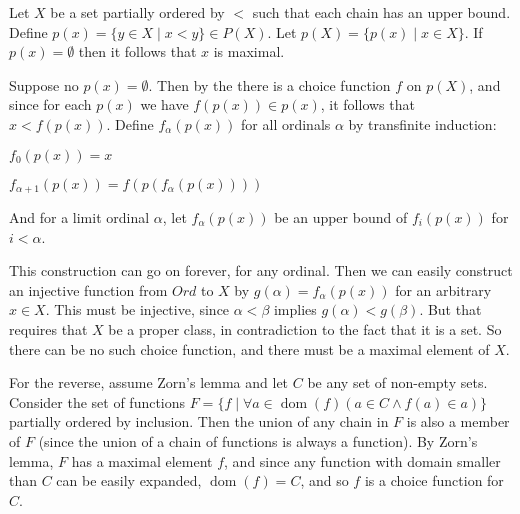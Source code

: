 \documentclass[12pt]{article}
\begin{document}
Let $X$ be a set partially ordered by $<$ such that each chain has an upper bound.  Define $p(x)=\{y\in X\mid x< y\}\in P(X)$.
Let $p(X)=\{p(x)\mid x\in X\}$.  If $p(x)=\emptyset$ then it follows that $x$ is maximal.

Suppose no $p(x)=\emptyset$.  Then by the  there is a choice function $f$ on $p(X)$, and since for each $p(x)$ we have $f(p(x))\in p(x)$, it follows that $x<f(p(x))$.  Define $f_\alpha(p(x))$ for all ordinals $\alpha$ by transfinite induction:

$f_0(p(x))=x$

$f_{\alpha+1}(p(x))=f(p(f_\alpha(p(x))))$

And for a limit ordinal $\alpha$, let $f_\alpha(p(x))$ be an upper bound of $f_i(p(x))$ for $i<\alpha$.

This construction can go on forever, for any ordinal.  Then we can easily construct an injective function from $Ord$ to $X$ by $g(\alpha)=f_\alpha(p(x))$ for an arbitrary $x\in X$.  This must be injective, since $\alpha<\beta$ implies $g(\alpha)<g(\beta)$.  But that requires that $X$ be a proper class, in contradiction to the fact that it is a set.  So there can be no such choice function, and there must be a maximal element of $X$.

For the reverse, assume Zorn's lemma and let $C$ be any set of non-empty sets.  Consider the set of functions $F=\{f\mid \forall a\in\operatorname{dom}(f) (a\in C \wedge f(a)\in a)\}$ partially ordered by inclusion.  Then the union of any chain in $F$ is also a member of $F$ (since the union of a chain of functions is always a function).  By Zorn's lemma, $F$ has a maximal element $f$, and since any function with domain smaller than $C$ can be easily expanded, $\operatorname{dom}(f)=C$, and so $f$ is a choice function for $C$.
\end{document}
